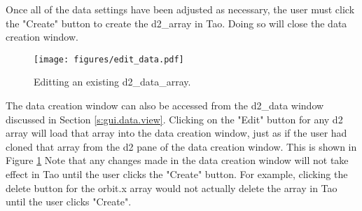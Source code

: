 Once all of the data settings have been adjusted as necessary, the user must click the "Create" button to create the d2_array in Tao.  Doing so will close the data creation window.

\begin{figure}
\centering
\texttt{[image: figures/edit\_data.pdf]}
\caption{Editting an existing d2_data_array.}
\label{fig:gui.edit.data}
\end{figure}

The data creation window can also be accessed from the d2_data window discussed in Section \ref{s:gui.data.view}.
Clicking on the "Edit" button for any d2 array will load that array into the data creation window, just as if the user had cloned that array from the d2 pane of the data creation window.
This is shown in Figure \ref{fig:gui.edit.data}
Note that any changes made in the data creation window will not take effect in Tao until the user clicks the "Create" button.
For example, clicking the delete button for the orbit.x array would not actually delete the array in Tao until the user clicks "Create".

